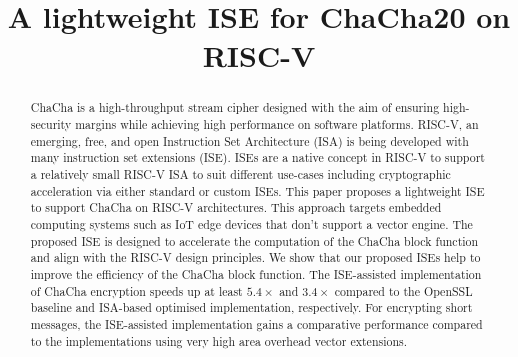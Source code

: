 \documentclass[conference]{IEEEtran}
\begin{document}

\title{A lightweight ISE for ChaCha20 on RISC-V}
%


\maketitle


\begin{abstract}
ChaCha is a high-throughput stream cipher designed with the aim of ensuring high-security margins while achieving high performance on software platforms. RISC-V, an emerging, free, and open Instruction Set Architecture (ISA) is being developed with many instruction set extensions (ISE). ISEs are a native concept in RISC-V to support a relatively small RISC-V ISA to suit different use-cases including cryptographic acceleration via either standard or custom ISEs. This paper proposes a lightweight ISE to support ChaCha on RISC-V architectures. This approach targets embedded computing systems such as IoT edge devices that don't support a vector engine. The proposed ISE is designed to accelerate the computation of the ChaCha block function and align with the  RISC-V design principles. We show that our proposed ISEs help to improve the efficiency of the ChaCha block function. 
The ISE-assisted implementation of ChaCha encryption speeds up at least $5.4\times$ and $3.4\times$ compared to the OpenSSL baseline and ISA-based optimised implementation, respectively. 
For encrypting short messages, the ISE-assisted implementation gains a comparative performance compared to the implementations using very high area overhead vector extensions.
\end{abstract}
\end{document}
